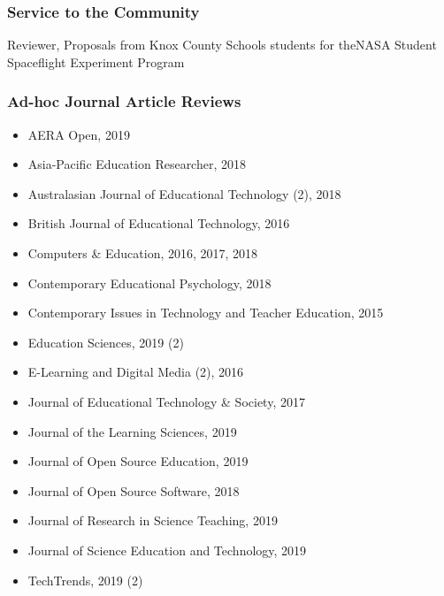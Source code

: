 \documentclass[14,]{article}
\providecommand{\tightlist}{%
  \setlength{\itemsep}{0pt}\setlength{\parskip}{0pt}}
\begin{document}
\hypertarget{service-to-the-community}{%
\subsubsection{Service to the
Community}\label{service-to-the-community}}

Reviewer, Proposals from Knox County Schools students for theNASA
Student Spaceflight Experiment Program

\hypertarget{ad-hoc-journal-article-reviews}{%
\subsubsection{Ad-hoc Journal Article
Reviews}\label{ad-hoc-journal-article-reviews}}

\begin{itemize}
\tightlist
\item
  AERA Open, 2019\\
\item
  Asia-Pacific Education Researcher, 2018\\
\item
  Australasian Journal of Educational Technology (2), 2018\\
\item
  British Journal of Educational Technology, 2016\\
\item
  Computers \& Education, 2016, 2017, 2018\\
\item
  Contemporary Educational Psychology, 2018\\
\item
  Contemporary Issues in Technology and Teacher Education, 2015\\
\item
  Education Sciences, 2019 (2)\\
\item
  E-Learning and Digital Media (2), 2016\\
\item
  Journal of Educational Technology \& Society, 2017\\
\item
  Journal of the Learning Sciences, 2019\\
\item
  Journal of Open Source Education, 2019\\
\item
  Journal of Open Source Software, 2018\\
\item
  Journal of Research in Science Teaching, 2019\\
\item
  Journal of Science Education and Technology, 2019\\
\item
  TechTrends, 2019 (2)
\end{itemize}
\end{document}
